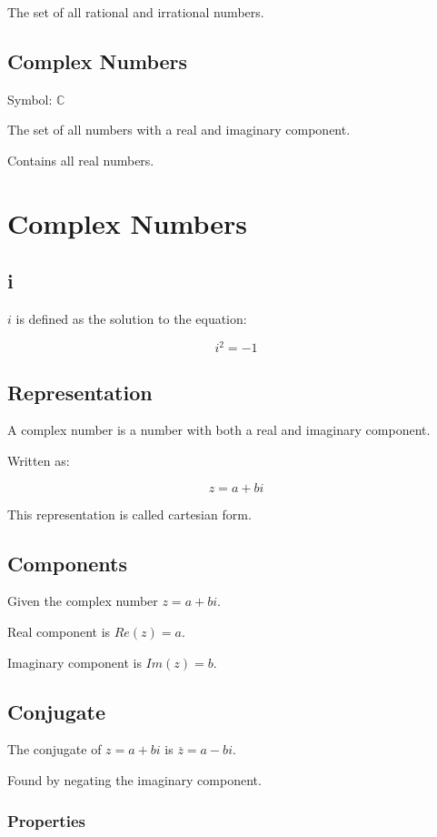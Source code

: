 \documentclass[a4paper,11pt]{article}
\begin{document}
The set of all rational and irrational numbers.


\subsection{Complex Numbers}

Symbol: $\mathbb{C}$

The set of all numbers with a real and imaginary component.

Contains all real numbers.



\section{Complex Numbers}

\subsection{i}

$i$ is defined as the solution to the equation:

$$
i^2 = -1
$$


\subsection{Representation}

A complex number is a number with both a real and imaginary component.

Written as:

$$
z = a + bi
$$

This representation is called cartesian form.


\subsection{Components}

Given the complex number $z = a + bi$.

Real component is $Re(z) = a$.

Imaginary component is $Im(z) = b$.


\subsection{Conjugate}

The conjugate of $z = a + bi$ is $\overline{z} = a - bi$.

Found by negating the imaginary component.


\subsubsection{Properties}
\end{document}
